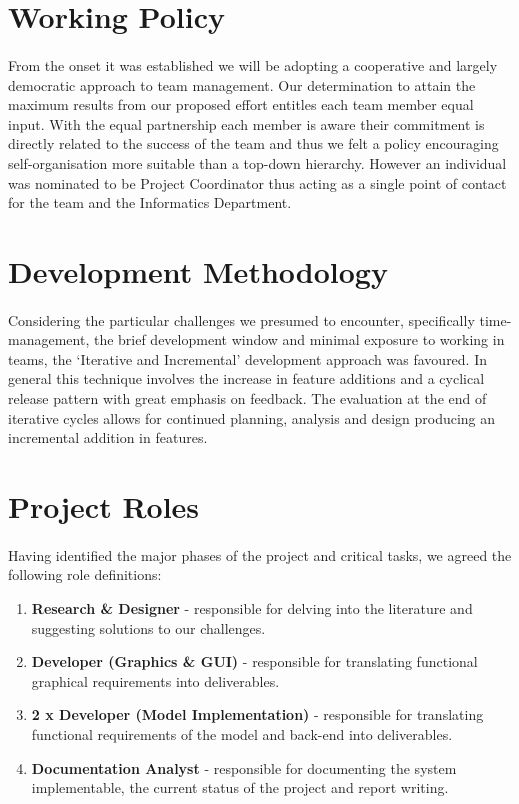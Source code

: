 \documentclass[11pt,a4paper]{article}
\begin{document}
\section{Working Policy}
\paragraph{}
From the onset it was established we will be adopting a cooperative and largely democratic approach to team management.  Our determination to attain the maximum results from our proposed effort entitles each team member equal input.  With the equal partnership each member is aware their commitment is directly related to the success of the team and thus we felt a policy encouraging self-organisation more suitable than a top-down hierarchy.  However an individual was nominated to be Project Coordinator thus acting as a single point of contact for the team and the Informatics Department.

\section{Development Methodology}
\paragraph{}
Considering the particular challenges we presumed to encounter, specifically time-management, the brief development window and minimal exposure to working in teams, the ‘Iterative and Incremental’ development approach was favoured.  In general this technique involves the increase in feature additions and a cyclical release pattern with great emphasis on feedback.  The evaluation at the end of iterative cycles allows for continued planning, analysis and design producing an incremental addition in features.

\section{Project Roles}
\paragraph{}
Having identified the major phases of the project and critical tasks, we agreed the following role definitions:

\begin{enumerate}[itemsep=-1ex]
  \item \textbf{Research \& Designer} - responsible for delving into the literature and suggesting solutions to our challenges.
  \item \textbf{Developer (Graphics \& GUI)} - responsible for translating functional graphical requirements into deliverables.
  \item \textbf{2 x Developer (Model Implementation)} - responsible for translating functional requirements of the model and back-end into deliverables.
  \item \textbf{Documentation Analyst} - responsible for documenting the system implementable, the current status of the project and report writing.
\end{enumerate}
\end{document}
